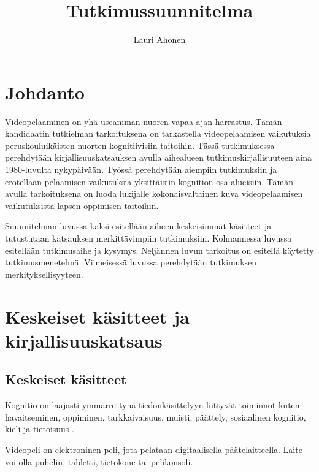 \documentclass[utf8,bachelor]{gradu3}
\begin{document}
\title{Tutkimussuunnitelma}
\author{Lauri Ahonen}

\subject{Kandidaatintutkielman}

\maketitle

\mainmatter

\chapter{Johdanto}

Videopelaaminen on yhä useamman nuoren vapaa-ajan harrastus. Tämän kandidaatin tutkielman tarkoituksena on tarkastella videopelaamisen vaikutuksia peruskouluikäisten nuorten kognitiivisiin taitoihin. Tässä tutkimuksessa perehdytään kirjallisuuskatsauksen avulla aihealueen tutkimuskirjallisuuteen aina 1980-luvulta nykypäivään. Työssä perehdytään aiempiin tutkimuksiin ja erotellaan pelaamisen vaikutuksia yksittäisiin kognition osa-alueisiin. Tämän avulla tarkoituksena on luoda lukijalle kokonaisvaltainen kuva videopelaamisen vaikutuksista lapsen oppimisen taitoihin.  

Suunnitelman luvussa kaksi esitellään aiheen keskeisimmät käsitteet ja tutustutaan katsauksen merkittävimpiin tutkimuksiin. Kolmannessa luvussa esitellään tutkimusaihe ja kysymys. Neljännen luvun tarkoitus on esitellä käytetty tutkimusmenetelmä. Viimeisessä luvussa perehdytään tutkimuksen merkityksellisyyteen.  

\chapter{Keskeiset käsitteet ja kirjallisuuskatsaus}

\section{Keskeiset käsitteet}

Kognitio on laajasti ymmärrettynä tiedonkäsittelyyn liittyvät toiminnot kuten havaitseminen, oppiminen, tarkkaivaisuus, muisti, päättely, sosiaalinen kognitio, kieli ja tietoisuus \parencite{hamalainen2006mieli}. 

Videopeli on elektroninen peli, jota pelataan digitaalisella päätelaitteella. Laite voi olla puhelin, tabletti, tietokone tai pelikonsoli.  
\end{document}
